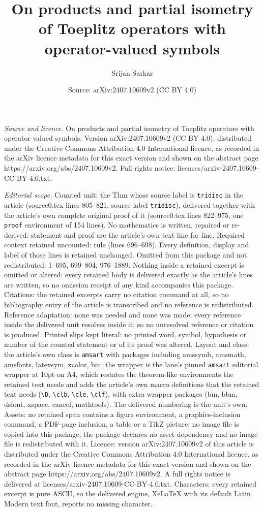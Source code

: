 \documentclass[10pt,a4paper]{amsart}
\title[On products and partial isometry of Toeplitz operators with ]{On products and partial isometry of Toeplitz operators with operator-valued symbols}
\author{Srijan Sarkar}
\date{Source: arXiv:2407.10609v2 (CC BY 4.0)}
\begin{document}
\maketitle

\noindent\emph{Source and licence.} On products and partial isometry of Toeplitz operators with operator-valued symbols. Version arXiv:2407.10609v2 (CC BY 4.0), distributed under the Creative Commons Attribution 4.0 International licence, as recorded in the arXiv licence metadata for this exact version and shown on the abstract page https://arxiv.org/abs/2407.10609v2. Full rights notice: licenses/arxiv-2407.10609-CC-BY-4.0.txt.\par\smallskip

\noindent\textit{Editorial scope.} Counted unit: the Thm whose source label is \texttt{tridisc} in the article (source0.tex lines 805--821, source label \texttt{tridisc}), delivered together with the article's own complete original proof of it (source0.tex lines 822--975, one \texttt{proof} environment of 154 lines). No mathematics is written, repaired or re-derived: statement and proof are the article's own text line for line. Required context retained uncounted: rule (lines 696--698). Every definition, display and label of those lines is retained unchanged. Omitted from this package and not redistributed: 1--695, 699--804, 976--1889. Nothing inside a retained excerpt is omitted or altered: every retained body is delivered exactly as the article's lines are written, so no omission receipt of any kind accompanies this package. Citations: the retained excerpts carry no citation command at all, so no bibliography entry of the article is transcribed and no reference is redistributed. Reference adaptation: none was needed and none was made; every reference inside the delivered unit resolves inside it, so no unresolved reference or citation is produced. Printed slips kept literal: no printed word, symbol, hypothesis or number of the counted statement or of its proof was altered. Layout and class: the article's own class is \texttt{amsart} with packages including amssymb, amsmath, amsfonts, latexsym, xcolor, bm; the wrapper is the lane's pinned \texttt{amsart} editorial wrapper at 10pt on A4, which restates the theorem-like environments the retained text needs and adds the article's own macro definitions that the retained text needs (\texttt{\textbackslash D}, \texttt{\textbackslash clb}, \texttt{\textbackslash cle}, \texttt{\textbackslash clf}), with extra wrapper packages (bm, bbm, dsfont, xspace, cancel, mathtools). The delivered numbering is the unit's own. Assets: no retained span contains a figure environment, a graphics-inclusion command, a PDF-page inclusion, a table or a TikZ picture; no image file is copied into this package, the package declares no asset dependency and no image file is redistributed with it. Licence: version arXiv:2407.10609v2 of this article is distributed under the Creative Commons Attribution 4.0 International licence, as recorded in the arXiv licence metadata for this exact version and shown on the abstract page https://arxiv.org/abs/2407.10609v2. A full rights notice is delivered at licenses/arxiv-2407.10609-CC-BY-4.0.txt. Characters: every retained excerpt is pure ASCII, so the delivered engine, XeLaTeX with its default Latin Modern text font, reports no missing character.
\end{document}
